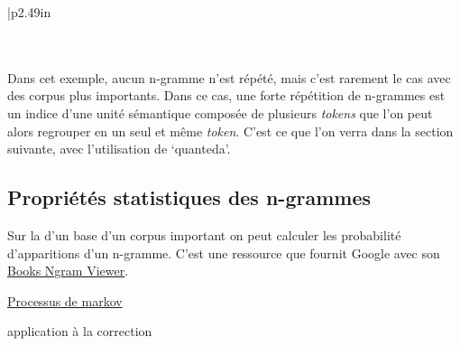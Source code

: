 \documentclass[
]{book}
\begin{document}
\begin{longtable}[c]{|p{2.49in}}
 \\





 \\





 \\

\noalign{\global\setlength{\arrayrulewidth}{2pt}}

\end{longtable}

Dans cet exemple, aucun n-gramme n'est répété, mais c'est rarement le cas avec des corpus plus importants. Dans ce cas, une forte répétition de n-grammes est un indice d'une unité sémantique composée de plusieurs \emph{tokens} que l'on peut alors regrouper en un seul et même \emph{token}. C'est ce que l'on verra dans la section suivante, avec l'utilisation de `quanteda'.

\hypertarget{propriuxe9tuxe9s-statistiques-des-n-grammes}{%
\subsection{Propriétés statistiques des n-grammes}\label{propriuxe9tuxe9s-statistiques-des-n-grammes}}

Sur la d'un base d'un corpus important on peut calculer les probabilité d'apparitions d'un n-gramme. C'est une ressource que fournit Google
avec son \href{https://books.google.com/ngrams/}{Books Ngram Viewer}.

\href{https://fr.wikipedia.org/wiki/N-gramme}{Processus de markov}

application à la correction
\end{document}
